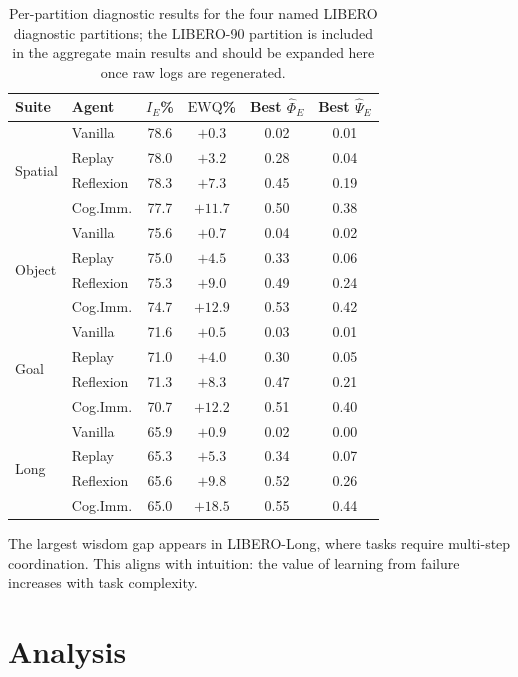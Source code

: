 ﻿\documentclass{article}
\newcommand{\EWQ}{\mathrm{EWQ}}
\begin{document}
\begin{table}[t]
\centering
\caption{Per-partition diagnostic results for the four named LIBERO diagnostic partitions; the LIBERO-90 partition is included in the aggregate main results and should be expanded here once raw logs are regenerated.}
\label{tab:per_suite}
\begin{tabular}{llcccc}
\toprule
\textbf{Suite} & \textbf{Agent} & $I_E$\% & $\EWQ$\% & Best $\hat{\Phi}_E$ & Best $\hat{\Psi}_E$ \\
\midrule
\multirow{4}{*}{Spatial}
    & Vanilla   & 78.6 & $+0.3$  & 0.02 & 0.01 \\
    & Replay    & 78.0 & $+3.2$  & 0.28 & 0.04 \\
    & Reflexion & 78.3 & $+7.3$  & 0.45 & 0.19 \\
    & Cog.Imm.  & 77.7 & $+11.7$ & 0.50 & 0.38 \\
\midrule
\multirow{4}{*}{Object}
    & Vanilla   & 75.6 & $+0.7$  & 0.04 & 0.02 \\
    & Replay    & 75.0 & $+4.5$  & 0.33 & 0.06 \\
    & Reflexion & 75.3 & $+9.0$  & 0.49 & 0.24 \\
    & Cog.Imm.  & 74.7 & $+12.9$ & 0.53 & 0.42 \\
\midrule
\multirow{4}{*}{Goal}
    & Vanilla   & 71.6 & $+0.5$  & 0.03 & 0.01 \\
    & Replay    & 71.0 & $+4.0$  & 0.30 & 0.05 \\
    & Reflexion & 71.3 & $+8.3$  & 0.47 & 0.21 \\
    & Cog.Imm.  & 70.7 & $+12.2$ & 0.51 & 0.40 \\
\midrule
\multirow{4}{*}{Long}
    & Vanilla   & 65.9 & $+0.9$  & 0.02 & 0.00 \\
    & Replay    & 65.3 & $+5.3$  & 0.34 & 0.07 \\
    & Reflexion & 65.6 & $+9.8$  & 0.52 & 0.26 \\
    & Cog.Imm.  & 65.0 & $+18.5$ & 0.55 & 0.44 \\
\bottomrule
\end{tabular}
\end{table}

The largest wisdom gap appears in LIBERO-Long, where tasks require multi-step coordination.
This aligns with intuition: the value of learning from failure increases with task complexity.

\section{Analysis}
\label{sec:analysis}
\end{document}
